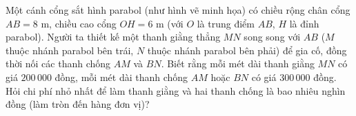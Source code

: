 \begin{bt}%
Một cánh cổng sắt hình parabol (như hình vẽ minh họa) có chiều rộng chân cổng $AB=8$ m, chiều cao cổng $OH=6$ m (với $O$ là trung điểm $AB$, $H$ là đỉnh parabol). Người ta thiết kế một thanh giằng thẳng $MN$ song song với $AB$ ($M$ thuộc nhánh parabol bên trái, $N$ thuộc nhánh parabol bên phải) để gia cố, đồng thời nối các thanh chống $AM$ và $BN$. Biết rằng mỗi mét dài thanh giằng $MN$ có giá $200\,000$ đồng, mỗi mét dài thanh chống $AM$ hoặc $BN$ có giá $300\,000$ đồng. Hỏi chi phí nhỏ nhất để làm thanh giằng và hai thanh chống là bao nhiêu nghìn đồng (làm tròn đến hàng đơn vị)?
\end{bt}

